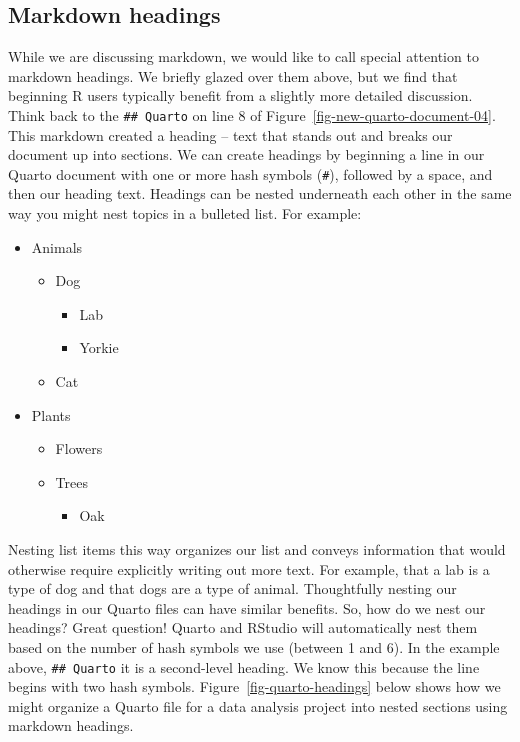 \documentclass[
  letterpaper,
  DIV=11,
  numbers=noendperiod]{scrreprt}
\providecommand{\tightlist}{%
  \setlength{\itemsep}{0pt}\setlength{\parskip}{0pt}}\usepackage{longtable,booktabs,array}
\begin{document}
\subsection{Markdown headings}\label{markdown-headings}

While we are discussing markdown, we would like to call special
attention to markdown headings. We briefly glazed over them above, but
we find that beginning R users typically benefit from a slightly more
detailed discussion. Think back to the \texttt{\#\#\ Quarto} on line 8
of Figure~\ref{fig-new-quarto-document-04}. This markdown created a
heading -- text that stands out and breaks our document up into
sections. We can create headings by beginning a line in our Quarto
document with one or more hash symbols (\texttt{\#}), followed by a
space, and then our heading text. Headings can be nested underneath each
other in the same way you might nest topics in a bulleted list. For
example:

\begin{itemize}
\tightlist
\item
  Animals

  \begin{itemize}
  \tightlist
  \item
    Dog

    \begin{itemize}
    \tightlist
    \item
      Lab
    \item
      Yorkie
    \end{itemize}
  \item
    Cat
  \end{itemize}
\item
  Plants

  \begin{itemize}
  \tightlist
  \item
    Flowers
  \item
    Trees

    \begin{itemize}
    \tightlist
    \item
      Oak
    \end{itemize}
  \end{itemize}
\end{itemize}

Nesting list items this way organizes our list and conveys information
that would otherwise require explicitly writing out more text. For
example, that a lab is a type of dog and that dogs are a type of animal.
Thoughtfully nesting our headings in our Quarto files can have similar
benefits. So, how do we nest our headings? Great question! Quarto and
RStudio will automatically nest them based on the number of hash symbols
we use (between 1 and 6). In the example above, \texttt{\#\#\ Quarto} it
is a second-level heading. We know this because the line begins with two
hash symbols. Figure~\ref{fig-quarto-headings} below shows how we might
organize a Quarto file for a data analysis project into nested sections
using markdown headings.
\end{document}
